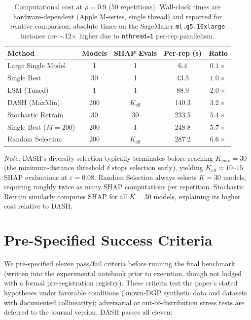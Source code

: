 \documentclass[10pt]{article}
\newcommand{\dash}{\textsc{DASH}}
\newcommand{\rhovar}{\rho}
\begin{document}
\begin{table}[H]
\centering
\caption{Computational cost at $\rhovar = 0.9$ (50 repetitions).
Wall-clock times are hardware-dependent (Apple M-series, single thread)
and reported for relative comparison; absolute times on the SageMaker
\texttt{ml.g5.16xlarge} instance are $\sim$12$\times$ higher due to
\texttt{nthread=1} per-rep parallelism.}
\label{tab:cost}
\small
\begin{tabular}{lcccc}
\toprule
\textbf{Method} & \textbf{Models} & \textbf{SHAP Evals} & \textbf{Per-rep (s)} & \textbf{Ratio} \\
\midrule
Large Single Model & 1  & 1  & \phantom{00}6.4 & $0.1\times$ \\
Single Best       & 30  & 1  & \phantom{0}43.5 & $1.0\times$ \\
LSM (Tuned)       & 1   & 1  & \phantom{0}88.9 & $2.0\times$ \\
\dash{} (MaxMin)  & 200 & $K_{\text{eff}}$ & 140.3 & $3.2\times$ \\
Stochastic Retrain & 30 & 30 & 233.5 & $5.4\times$ \\
Single Best ($M{=}200$)  & 200 & 1  & 248.8 & $5.7\times$ \\
Random Selection  & 200 & $K_{\text{eff}}$ & 287.2 & $6.6\times$ \\
\bottomrule
\end{tabular}
\smallskip

\noindent\textit{Note:} \dash{}'s diversity selection typically terminates
before reaching $K_{\max} = 30$ (the minimum-distance threshold $\delta$
stops selection early), yielding $K_{\text{eff}} \approx 10$--$15$ SHAP
evaluations at $\varepsilon = 0.08$. Random Selection always selects
$K = 30$ models, requiring roughly twice as many SHAP computations per
repetition. Stochastic Retrain similarly computes SHAP for all $K = 30$
models, explaining its higher cost relative to \dash{}.
\end{table}

\section{Pre-Specified Success Criteria}
\label{app:criteria}

We pre-specified eleven pass/fail criteria before running the final
benchmark (written into the experimental notebook prior to execution,
though not lodged with a formal pre-registration registry). These criteria test the paper's stated hypotheses under
favorable conditions (known-DGP synthetic data and datasets with
documented collinearity); adversarial or out-of-distribution stress
tests are deferred to the journal version. \dash{} passes all eleven:
\end{document}
